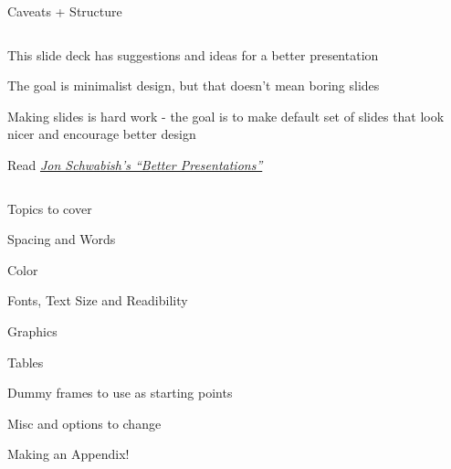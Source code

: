 \documentclass[notes,11pt, aspectratio=169]{beamer}
\newenvironment{wideitemize}{\itemize\addtolength{\itemsep}{10pt}}{\enditemize}
\begin{document}
\begin{frame}{Caveats + Structure}
\begin{columns}[T] %
\begin{column}{.58\textwidth}
  \begin{wideitemize}
    \item This slide deck has suggestions and ideas for a better presentation
    \item The goal is minimalist design, but that doesn't mean boring slides
    \item Making slides is hard work - the goal is to make default set
      of slides that look nicer and encourage better design
    \item Read \emph{\textcolor{blue}{\href{https://www.amazon.com/Better-Presentations-Guide-Scholars-Researchers/dp/0231175213/}{Jon Schwabish's ``Better Presentations''}}}
  \end{wideitemize}
\end{column}%
\hfill%
\begin{column}{.38\textwidth}
\end{column}%
\end{columns}
\end{frame}

\begin{frame}{Topics to cover}
  \begin{wideitemize}
    \item Spacing and Words
    \item Color
    \item Fonts, Text Size and Readibility
    \item Graphics
    \item Tables
    \item Dummy frames to use as starting points
    \item Misc and options to change
    \item Making an Appendix!
  \end{wideitemize}
\end{frame}
\end{document}
